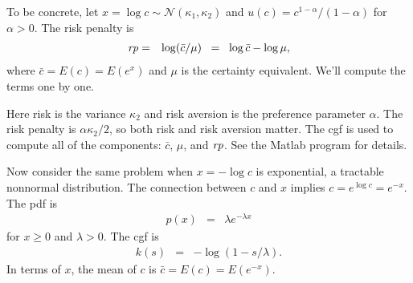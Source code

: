 \documentclass[11pt]{exam}
\begin{document}
\begin{questions}
To be concrete, let $x = \log c \sim \mathcal{N}(\kappa_1, \kappa_2)$
and $u(c) = c^{1-\alpha}/(1-\alpha)$ for $\alpha> 0$.
The risk penalty is
\begin{eqnarray*}
    \mbox{\it rp\/} &=& \log (\bar{c}/\mu)
                \;\;=\;\; \log \bar{c} - \log \mu ,
\end{eqnarray*}
where $\bar{c} = E (c) = E( e^{x})$ and $\mu$ is the certainty equivalent.
We'll compute the terms one by one.


\begin{solution}
Here risk is the variance $\kappa_2$ and risk aversion is the preference
parameter $\alpha$.
The risk penalty is $\alpha\kappa_2/2$, so both risk and risk aversion matter.
The cgf is used to compute all of the components:
$\bar{c}$, $\mu$, and $\mbox{\it rp\/}$.
See the Matlab program for details.
\end{solution}

Now consider the same problem when $x = - \log c $ is exponential,
a tractable nonnormal distribution.
The connection between $c$ and $x$ implies $c = e^{\log c} = e^{-x}$.
The pdf is
\begin{eqnarray*}
    p(x)  &=& \lambda e^{-\lambda x}
\end{eqnarray*}
for $x \geq 0$ and $\lambda > 0$.
The cgf is
\begin{eqnarray*}
    k(s)  &=& - \log \left( 1 - s/\lambda \right) .
\end{eqnarray*}
In terms of $x$, the mean of $c$ is $\bar{c} = E(c) = E (e^{-x})$.


\end{questions}
\end{document}
